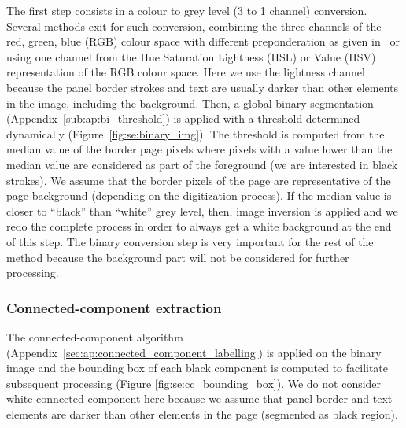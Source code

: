 The first step consists in a colour to grey level (3 to 1 channel) conversion.
Several methods exit for such conversion, combining the three channels of the red, green, blue (RGB) colour space with different preponderation as given in~\cite{Pratt91} or using one channel from the Hue Saturation Lightness (HSL) or Value (HSV) representation of the RGB colour space.
Here we use the lightness channel because the panel border strokes and text are usually darker than other elements in the image, including the background. 
Then, a global binary segmentation (Appendix~\ref{sub:ap:bi_threshold}) is applied with a threshold determined dynamically (Figure~\ref{fig:se:binary_img}).
The threshold is computed from the median value of the border page pixels where pixels with a value lower than the median value are considered as part of the foreground (we are interested in black strokes).
We assume that the border pixels of the page are representative of the page background (depending on the digitization process).
If the median value is closer to ``black'' than ``white'' grey level, then, image inversion is applied and we redo the complete process in order to always get a white background at the end of this step.
The binary conversion step is very important for the rest of the method because the background part will not be considered for further processing. %


\subsubsection{Connected-component extraction} %
 \label{par:connected_component_extraction}
 
The connected-component algorithm (Appendix~\ref{sec:ap:connected_component_labelling}) is applied on the binary image and the bounding box of each black component is computed to facilitate subsequent processing (Figure \ref{fig:se:cc_bounding_box}).
We do not consider white connected-component here because we assume that panel border and text elements are darker than other elements in the page (segmented as black region).

